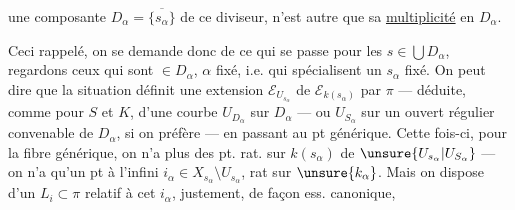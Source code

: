 une composante $D_\alpha=\overline{\{s_\alpha\}}$ de ce diviseur, n'est autre que sa \uline{multiplicité} en $D_\alpha$.

Ceci rappelé, on se demande donc de ce qui se passe pour les $s\in\bigcup D_\alpha$,    regardons ceux qui sont $\in D_\alpha$, $\alpha$ fixé, i.e. qui spécialisent un $s_\alpha$ fixé. On peut dire que la situation définit une extension $\mathcal E_{U_{s_\alpha}}$ de $\mathcal E_{k(s_\alpha)}$ par $\pi$ --- déduite, comme  pour $S$ et $K$, d'une courbe  $U_{D_\alpha}$ sur $D_\alpha$ --- ou $U_{S_\alpha}$ sur un ouvert régulier convenable de $D_\alpha$, si on préfère --- en passant au pt générique. Cette fois-ci, pour la fibre générique, on n'a plus des  pt. rat. sur $k(s_\alpha)$ de $\unsure{U_{s_\alpha}|U_{S_\alpha}}$ --- on n'a qu'un pt à l'infini $i_\alpha\in X_{s_\alpha}\setminus U_{s_\alpha}$, rat sur $\unsure{k_\alpha}$. Mais on dispose  d'un $L_i\subset\pi$ relatif à cet $i_\alpha$, justement, de façon ess. canonique,
